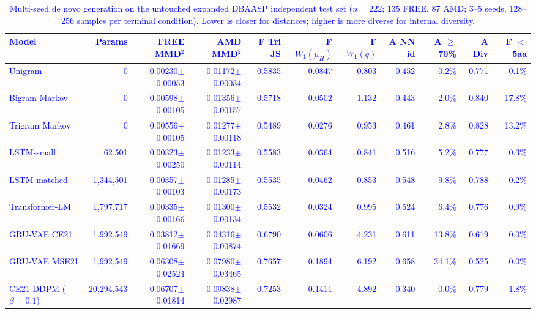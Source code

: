 \documentclass[unnumsec,webpdf,contemporary,large]{oup-authoring-template}
\newcommand{\rev}[1]{\textcolor{blue}{#1}}
\begin{document}
\begin{table}[t]
\caption{\rev{Multi-seed de novo generation on the untouched expanded DBAASP independent test set ($n=222$; 135 FREE, 87 AMD; 3--5 seeds, 128--256 samples per terminal condition). Lower is closer for distances; higher is more diverse for internal diversity.}}
\label{tab:generation_expanded}
\centering
\footnotesize
\begin{tabular}{lrrrrrrrrrr}
\toprule
\rev{Model} & \rev{Params} & \rev{FREE MMD$^2$} & \rev{AMD MMD$^2$} & \rev{F Tri JS} & \rev{F $W_1(\mu_H)$} & \rev{F $W_1(q)$} & \rev{A NN id} & \rev{A $\geq$70\%} & \rev{A Div} & \rev{F $<$5aa} \\
\midrule
\rev{Unigram} & \rev{0} & \rev{0.00230$\pm$0.00053} & \rev{0.01172$\pm$0.00034} & \rev{0.5835} & \rev{0.0847} & \rev{0.803} & \rev{0.452} & \rev{0.2\%} & \rev{0.771} & \rev{0.1\%} \\
\rev{Bigram Markov} & \rev{0} & \rev{0.00598$\pm$0.00105} & \rev{0.01356$\pm$0.00157} & \rev{0.5718} & \rev{0.0502} & \rev{1.132} & \rev{0.443} & \rev{2.0\%} & \rev{0.840} & \rev{17.8\%} \\
\rev{Trigram Markov} & \rev{0} & \rev{0.00556$\pm$0.00105} & \rev{0.01277$\pm$0.00118} & \rev{0.5489} & \rev{0.0276} & \rev{0.953} & \rev{0.461} & \rev{2.8\%} & \rev{0.828} & \rev{13.2\%} \\
\rev{LSTM-small} & \rev{62,501} & \rev{0.00323$\pm$0.00250} & \rev{0.01233$\pm$0.00114} & \rev{0.5583} & \rev{0.0364} & \rev{0.841} & \rev{0.516} & \rev{5.2\%} & \rev{0.777} & \rev{0.3\%} \\
\rev{LSTM-matched} & \rev{1,344,501} & \rev{0.00357$\pm$0.00103} & \rev{0.01285$\pm$0.00173} & \rev{0.5535} & \rev{0.0462} & \rev{0.853} & \rev{0.548} & \rev{9.8\%} & \rev{0.788} & \rev{0.2\%} \\
\rev{Transformer-LM} & \rev{1,797,717} & \rev{0.00335$\pm$0.00166} & \rev{0.01300$\pm$0.00134} & \rev{0.5532} & \rev{0.0324} & \rev{0.995} & \rev{0.524} & \rev{6.4\%} & \rev{0.776} & \rev{0.9\%} \\
\rev{GRU-VAE CE21} & \rev{1,992,549} & \rev{0.03812$\pm$0.01669} & \rev{0.04316$\pm$0.00874} & \rev{0.6790} & \rev{0.0606} & \rev{4.231} & \rev{0.611} & \rev{13.8\%} & \rev{0.619} & \rev{0.0\%} \\
\rev{GRU-VAE MSE21} & \rev{1,992,549} & \rev{0.06308$\pm$0.02524} & \rev{0.07980$\pm$0.03465} & \rev{0.7657} & \rev{0.1894} & \rev{6.192} & \rev{0.658} & \rev{34.1\%} & \rev{0.525} & \rev{0.0\%} \\
\rev{CE21-DDPM ($\beta=0.1$)} & \rev{20,294,543} & \rev{0.06707$\pm$0.01814} & \rev{0.09838$\pm$0.02987} & \rev{0.7253} & \rev{0.1411} & \rev{4.892} & \rev{0.340} & \rev{0.0\%} & \rev{0.779} & \rev{1.8\%} \\

\end{tabular}
\end{table}
\end{document}
